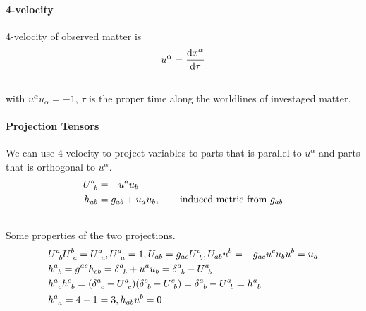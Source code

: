\documentclass[letterpaper,10pt,english]{sphinxmanual}
\begin{document}
\paragraph{4-velocity}
\label{relativity/GeneralRelativity:velocity}
4-velocity of observed matter is
\begin{gather}
\begin{split}u^\alpha = \frac{\mathrm d x^\alpha}{\mathrm d \tau}\end{split}\notag\\\begin{split}\end{split}\notag
\end{gather}
with $u^\alpha u_\alpha =-1$, $\tau$ is the proper time along the worldlines of investaged matter.


\paragraph{Projection Tensors}
\label{relativity/GeneralRelativity:projection-tensors}
We can use 4-velocity to project variables to parts that is parallel to $u^\alpha$ and parts that is orthogonal to $u^\alpha$.
\begin{gather}
\begin{split}U^a_{\phantom a b} &= -u^a u_b \\
h_{ab} &= g_{ab} + u_a u_b, \qquad \text{induced metric from } g _{ab}\end{split}\notag\\\begin{split}\end{split}\notag
\end{gather}
Some properties of the  two projections.
\begin{gather}
\begin{split}& U^a_{\phantom a b} U^b_{\phantom bc} = U^a_{\phantom a c}  ,  U^a_{\phantom a a} = 1  , U_{ab}=g_{ac} U^c_{\phantom cb}  , U_{ab} u^b = - g_{ac} u^c u_b u^b = u_a \\
& h^a_{\phantom ab} = g^{ac} h_{cb} = \delta^a_{\phantom ab} + u^a u_b = \delta^a_{\phantom ab} - U^a_{\phantom ab} \\
& h^a_{\phantom a c}h^c_{\phantom c b} = (\delta^a_{\phantom ac} - U^a_{\phantom ac})(\delta^c_{\phantom cb} - U^c_{\phantom cb}) = \delta^a_{\phantom ab} - U^a_{\phantom ab} = h^a_{\phantom ab} \\
& h^a_{\phantom aa} = 4-1 = 3  ,   h_{ab}u^b = 0\end{split}\notag\\\begin{split}\end{split}\notag
\end{gather}
\end{document}
